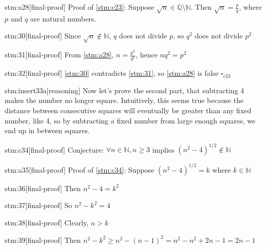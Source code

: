 \begin{stm}{stm:a28}[final-proof]
Proof of \ref{stm:c23}: Suppose $\sqrt{n} \in \mathbb{Q} \setminus \mathbb{N}$. Then $\sqrt{n} = \frac{p}{q}$, where $p$ and $q$ are natural numbers.
\end{stm}

\begin{stm}{stm:30}[final-proof]
Since $\sqrt{n} \notin \mathbb{N}$, $q$ does not divide $p$, so $q^2$ does not divide $p^2$
\end{stm}

\begin{stm}{stm:31}[final-proof]
From \ref{stm:a28}, $n = \frac{p^2}{q^2}$, hence $n q^2 = p^2$
\end{stm}

\begin{stm}{stm:32}[final-proof]
\ref{stm:30} contradicts \ref{stm:31}, so \ref{stm:a28} is false $\square_{c23}$
\end{stm}

\begin{stm}{stm:insert33a}[reasoning]
Now let's prove the second part, that subtracting 4 makes the number no longer square. Intuitively, this seems true because the distance between consecutive squares will eventually be greater than any fixed number, like 4, so by subtracting a fixed number from large enough squares, we end up in between squares.
\end{stm}

\begin{stm}{stm:c34}[final-proof]
Conjecture: $\forall n \in \mathbb{N}, n \ge 3$ implies $(n^2 - 4)^{1/2} \notin \mathbb{N}$
\end{stm}

\begin{stm}{stm:a35}[final-proof]
Proof of \ref{stm:c34}: Suppose $(n^2 - 4)^{1/2} = k$ where $k \in \mathbb{N}$
\end{stm}

\begin{stm}{stm:36}[final-proof]
Then $n^2 - 4 = k^2$
\end{stm}

\begin{stm}{stm:37}[final-proof]
So $n^2 - k^2 = 4$
\end{stm}

\begin{stm}{stm:38}[final-proof]
Clearly, $n > k$
\end{stm}

\begin{stm}{stm:39}[final-proof]
Then $n^2 - k^2 \ge n^2 - (n - 1)^2 = n^2 - n^2 + 2n - 1 = 2n - 1$
\end{stm}

